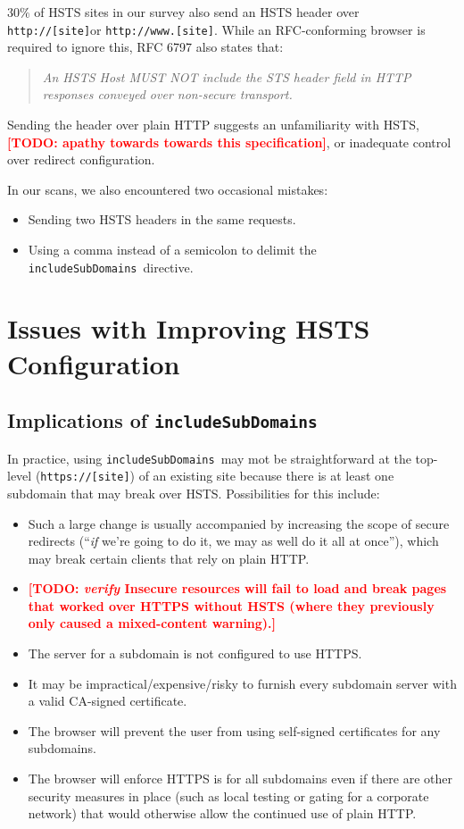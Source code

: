 \documentclass[conference]{./IEEEtran}
\newcommand{\todo}[1]{\textcolor{red}{\textbf{[TODO: #1]}}}
\newcommand{\td}[2]{\textcolor{red}{\textbf{[TODO: {\it{#1}} #2]}}}
\newcommand{\site}[1]{\texttt{#1}}
\newcommand{\code}[1]{\texttt{#1}}
\newcommand{\iSD}{{\code{includeSubDomains}}}
\newcommand{\genericsite}{[site]}
\newcommand{\h}{{\site{http://\genericsite}}}
\newcommand{\s}{{\site{https://\genericsite}}}
\newcommand{\hw}{{\site{http://www.\genericsite}}}
\theoremstyle{plain}
\begin{document}
$30\%$ of HSTS sites in our survey also send an HSTS header over \h or \hw. While an RFC-conforming browser is required to ignore this, RFC 6797\cite{rfc} also states that:

\begin{quotation}\it
An HSTS Host MUST NOT include the STS header field in HTTP responses conveyed over non-secure transport.
\end{quotation}

Sending the header over plain HTTP suggests an unfamiliarity with HSTS, \todo{apathy towards towards this specification}, or inadequate control over redirect configuration.

In our scans, we also encountered two occasional mistakes:

\begin{itemize}
\item Sending two HSTS headers in the same requests.
\item Using a comma instead of a semicolon to delimit the \iSD~directive.
\end{itemize}


\section{Issues with Improving HSTS Configuration}

\subsection{Implications of \iSD}
\label{includeSubDomains-issues}

In practice, using \iSD~may mot be straightforward at the top-level (\s) of an existing site because there is at least one subdomain that may break over HSTS. Possibilities for this include:

\begin{itemize}
\item Such a large change is usually accompanied by increasing the scope of secure redirects (``\emph{if} we're going to do it, we may as well do it all at once''), which may break certain clients that rely on plain HTTP.
\item \td{verify}{Insecure resources will fail to load and break pages that worked over HTTPS without HSTS (where they previously only caused a mixed-content warning).}
\item The server for a subdomain is not configured to use HTTPS.
\item It may be impractical/expensive/risky to furnish every subdomain server with a valid CA-signed certificate.
\item The browser will prevent the user from using self-signed certificates for any subdomains.
\item The browser will enforce HTTPS is for all subdomains even if there are other security measures in place (such as local testing or gating for a corporate network) that would otherwise allow the continued use of plain HTTP.
\end{itemize}
\end{document}
